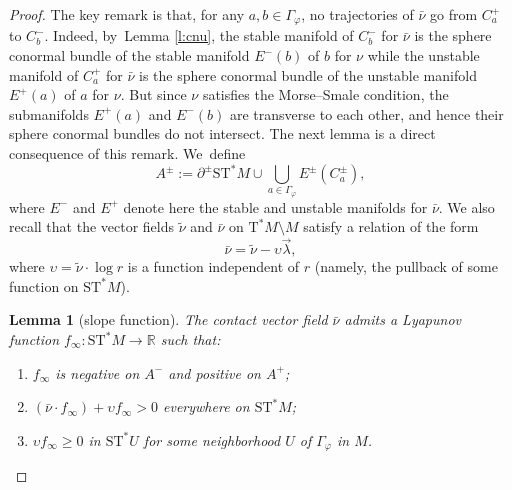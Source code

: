 \documentclass[10pt]{amsart}
\newenvironment{enumeratei}
{\bgroup\def\theenumi{\roman{enumi}}\def\theenumii{\arabic{enumii}}\begin{enumerate}}
{\end{enumerate}\egroup}
\newcommand{\R}{{\mathbb R}}
\newcommand{\Crit}{\Gamma_{\!\varphi}}
\newcommand{\tu}[1]{\textup{#1}}
\newcommand{\sT}{\mathrm{T}^\ast}
\newcommand{\sST}{\mathrm{ST}^\ast}
\newcommand{\hnu}{\tilde\nu}
\newcommand{\cnu}{\bar\nu}
\newcommand{\de}{\mathrel{:=}}
\let\del\partial
\let\on\colon
\let\ups\upsilon
\theoremstyle{plain}
\newtheorem{lemma}[theorem]{Lemma}
\theoremstyle{definition}
\begin{document}
\begin{proof}
The key remark is that, for any $a, b \in \Crit$, no trajectories of $\cnu$ go
from $C_a^+$ to $C_b^-$. Indeed, by~Lemma \ref{l:cnu}, the stable manifold of
$C_b^-$ for $\cnu$ is the sphere conormal bundle of the stable manifold $E^-(b)$
of $b$ for $\nu$ while the unstable manifold of $C_a^+$ for $\cnu$ is the sphere
conormal bundle of the unstable manifold $E^+(a)$ of $a$ for $\nu$. But since
$\nu$ satisfies the Morse--Smale condition, the submanifolds $E^+(a)$ and $E^-
(b)$ are transverse to each other, and hence their sphere conormal bundles do
not intersect. The next lemma is a direct consequence of this remark. We~define
\[
A^\pm \de \del^\pm \sST M \cup \bigcup_{a \in \Crit} E^\pm(C_a^\pm),
\]
where $E^-$ and $E^+$ denote here the stable and unstable manifolds for $\cnu$.
We also recall that the vector fields $\hnu$ and $\cnu$ on $\sT M \setminus M$ satisfy a
relation of the form
\[
\cnu = \hnu - \ups \vec\lambda,
\]
where $\ups = \hnu \cdot \log r$ is a function independent of $r$ (namely, the
pullback of some function on $\sST M$).

\begin{lemma}[slope function] \label{l:slope}
The contact vector field $\cnu$ admits a Lyapunov function $f_\infty \on \sST
M \to \R$ such that\tu:
\begin{enumeratei}
\item\label{l:slopei}
$f_\infty$ is negative on $A^-$ and positive on $A^+$\tu;
\item\label{l:slopeii}
$(\cnu \cdot f_\infty) + \ups f_\infty > 0$ everywhere on $\sST M$\tu;
\item\label{l:slopeiii}
$\ups f_\infty \ge 0$ in $\sST U$ for some neighborhood $U$ of $\Crit$ in $M$.
\end{enumeratei}
\end{lemma}


\end{proof}
\end{document}

